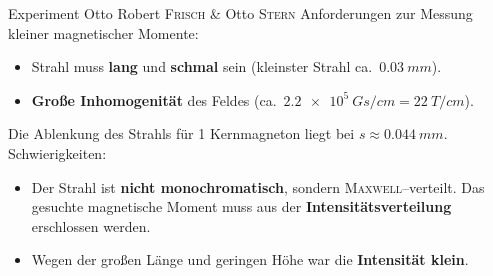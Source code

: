 \documentclass[t,9pt]{beamer}
\newcommand{\highlight}[3]{ \begin{textblock*}{#1}(#2,#3) \begin{tcolorbox} [enhanced,opacityfill=.1,colback=blue] \end{tcolorbox} \end{textblock*} } %
\begin{document}
        \begin{frame}{Experiment Otto Robert \textsc{Frisch} \& Otto \textsc{Stern}}
                Anforderungen zur Messung kleiner magnetischer Momente:\\
                \begin{itemize}
                        \item Strahl muss \textbf{lang} und \textbf{schmal} sein (kleinster Strahl ca.\ $\SI{0.03}{mm}$).
                        \item \textbf{Große Inhomogenität} des Feldes (ca.\ $\SI{2.2e+5}{Gs/cm}=\SI{22}{T/cm}$).
                \end{itemize}
                \pause
                \vspace{.5cm} Die Ablenkung des Strahls für 1 Kernmagneton liegt bei $s\approx \SI{0.044}{mm}$.
                \\\vspace{.5cm}Schwierigkeiten:
                \begin{itemize}
                \pause
                        \item Der Strahl ist \textbf{nicht monochromatisch}, sondern \textsc{Maxwell}--verteilt. Das gesuchte magnetische Moment muss aus der \textbf{Intensitätsverteilung} erschlossen werden.
                        \item Wegen der großen Länge und geringen Höhe war die \textbf{Intensität klein}.
                \end{itemize}
                \hfill\tiny\cite{FrischStern1933}\normalsize
        \end{frame}

\end{document}
